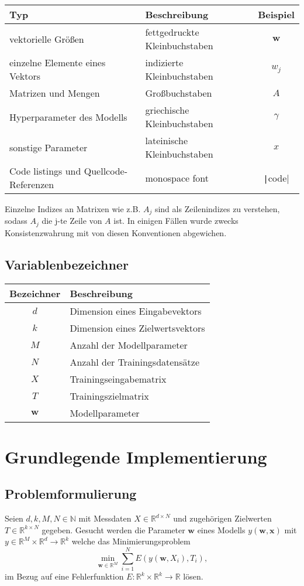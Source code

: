 \documentclass{article}
\theoremstyle{plain} %
\theoremstyle{definition} %
\begin{document}
\begin{tabular}{llc}
  \toprule
  Typ & Beschreibung & Beispiel \\
  \midrule
  vektorielle Größen & fettgedruckte Kleinbuchstaben & $\mathbf{w}$ \\
  einzelne Elemente eines Vektors & indizierte Kleinbuchstaben & $w_j$ \\
  Matrizen und Mengen & Großbuchstaben & $A$ \\
  Hyperparameter des Modells & griechische Kleinbuchstaben & $\gamma$ \\
  sonstige Parameter & lateinische Kleinbuchstaben & $x$ \\
  Code listings und Quellcode-Referenzen & monospace font & \texttt|code| \\
\end{tabular}

Einzelne Indizes an Matrixen wie z.B. $A_j$ sind als Zeilenindizes zu verstehen, sodass $A_j$ die j-te Zeile von $A$ ist.
In einigen Fällen wurde zwecks Konsistenzwahrung mit \cite{Bishop} von diesen Konventionen abgewichen.

\subsection{Variablenbezeichner}


\begin{tabular}{cl}
  \toprule
  Bezeichner & Beschreibung\\
  \midrule
  $d$ & Dimension eines Eingabevektors\\
  $k$ & Dimension eines Zielwertsvektors\\
  $M$ & Anzahl der Modellparameter\\
  $N$ & Anzahl der Trainingsdatensätze\\
  $X$ & Trainingseingabematrix\\
  $T$ & Trainingszielmatrix\\
  $\mathbf{w}$ & Modellparameter\\
\end{tabular}


\section{Grundlegende Implementierung}
\subsection{Problemformulierung}
Seien $d,k,M,N \in \mathbb{N}$ mit Messdaten $X \in \mathbb{R}^{d \times N}$ und zugehörigen Zielwerten $T \in \mathbb{R}^{k \times N}$ gegeben. Gesucht werden die Parameter $\mathbf{w}$ eines Modells $y(\mathbf{w}, \mathbf{x})$ mit $y \in \mathbb{R}^M \times \mathbb{R}^d \rightarrow \mathbb{R}^{k}$ welche das Minimierungsproblem
$$
    \min_{\mathbf{w} \in \mathbb{R}^M}\sum_{i=1}^N E(y(\mathbf{w}, X_{i}), T_{i}),
$$
im Bezug auf eine Fehlerfunktion $E: \mathbb{R}^k \times \mathbb{R}^k \rightarrow \mathbb{R}$ lösen.
\end{document}
